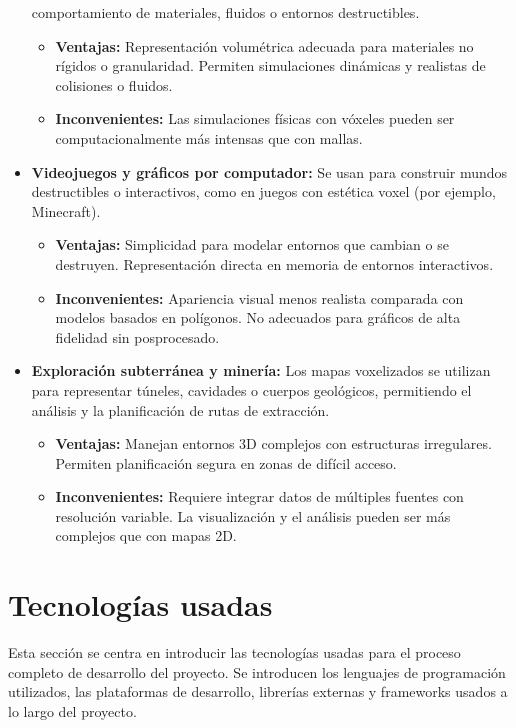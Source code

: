 \documentclass[12pt, a4paper, twoside]{article}
\begin{document}
\begin{itemize}
  comportamiento de materiales, fluidos o entornos destructibles.
  \begin{itemize}
    \item \textbf{Ventajas:} Representación volumétrica adecuada para materiales no rígidos o granularidad. Permiten simulaciones 
    dinámicas y realistas de colisiones o fluidos.
    \item \textbf{Inconvenientes:} Las simulaciones físicas con vóxeles pueden ser computacionalmente más intensas que con mallas.
  \end{itemize}
  \item \textbf{Videojuegos y gráficos por computador:} Se usan para construir mundos destructibles o interactivos, como en 
  juegos con estética voxel (por ejemplo, Minecraft).
  \begin{itemize}
    \item \textbf{Ventajas:} Simplicidad para modelar entornos que cambian o se destruyen. Representación directa en memoria 
    de entornos interactivos.
    \item \textbf{Inconvenientes:} Apariencia visual menos realista comparada con modelos basados en polígonos. No adecuados 
    para gráficos de alta fidelidad sin posprocesado.
  \end{itemize}
  \item \textbf{Exploración subterránea y minería:} Los mapas voxelizados se utilizan para representar túneles, cavidades o 
  cuerpos geológicos, permitiendo el análisis y la planificación de rutas de extracción.
  \begin{itemize}
    \item \textbf{Ventajas:} Manejan entornos 3D complejos con estructuras irregulares. Permiten planificación segura en 
    zonas de difícil acceso.
    \item \textbf{Inconvenientes:} Requiere integrar datos de múltiples fuentes con resolución variable. La visualización y 
    el análisis pueden ser más complejos que con mapas 2D.
  \end{itemize}
\end{itemize}

\section{Tecnologías usadas}
Esta sección se centra en introducir las tecnologías usadas para el proceso completo de desarrollo del proyecto. 
Se introducen los lenguajes de programación utilizados, las plataformas de desarrollo, librerías externas y frameworks usados
a lo largo del proyecto.
\end{document}
